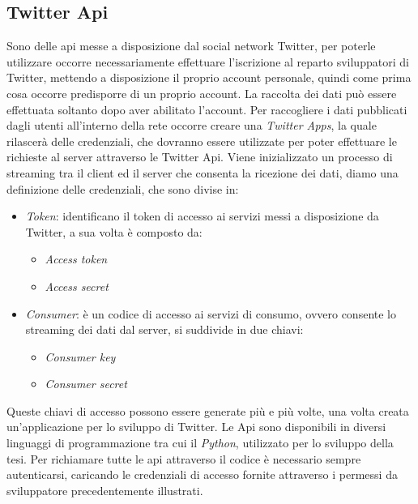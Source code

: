 \subsection{Twitter Api}
Sono delle api messe a disposizione dal social network Twitter, per poterle utilizzare occorre necessariamente effettuare l'iscrizione al reparto sviluppatori di Twitter, mettendo a disposizione il proprio account personale, quindi come prima cosa occorre predisporre di un proprio account. La raccolta dei dati può essere effettuata soltanto dopo aver abilitato l'account. Per raccogliere i dati pubblicati dagli utenti all'interno della rete occorre creare una \textit{Twitter Apps}, la quale rilascerà delle credenziali, che dovranno essere utilizzate per poter effettuare le richieste  al server attraverso le Twitter Api. Viene inizializzato un processo di streaming tra il client ed il server che consenta la ricezione dei dati, diamo una definizione delle credenziali, che sono divise in:
\begin{itemize}
\item \textit{Token}: identificano il token di accesso ai servizi messi a disposizione da Twitter, a sua volta è composto da:
\begin{itemize}
\item \textit{Access token}
\item \textit{Access secret}
\end{itemize}
\item \textit{Consumer}: è un codice di accesso ai servizi di consumo, ovvero consente lo streaming dei dati dal server, si suddivide in due chiavi:
\begin{itemize}
\item \textit{Consumer key}
\item \textit{Consumer secret}
\end{itemize}
\end{itemize}
Queste chiavi di accesso possono essere generate più e più volte, una volta creata un'applicazione per lo sviluppo di Twitter.
Le Api sono disponibili in diversi linguaggi di programmazione tra cui il \textit{Python}, utilizzato per lo sviluppo della tesi.
Per richiamare tutte le api attraverso il codice è necessario sempre autenticarsi, caricando le credenziali di accesso  fornite attraverso i permessi da sviluppatore precedentemente illustrati.
